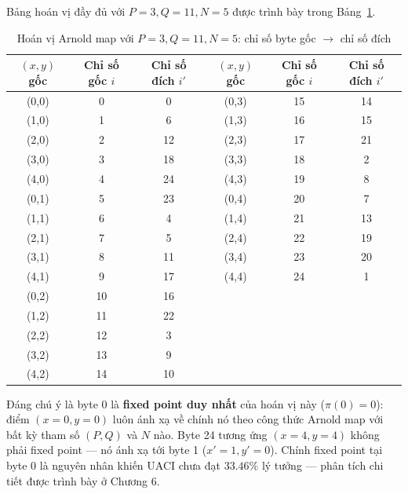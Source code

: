 Bảng hoán vị đầy đủ với $P=3, Q=11, N=5$ được trình bày trong Bảng~\ref{tab:arnold_perm}.

\begin{table}[ht]
\centering
\caption{Hoán vị Arnold map với $P=3, Q=11, N=5$: chỉ số byte gốc $\to$ chỉ số đích}
\label{tab:arnold_perm}
\begin{tabular}{|c|c|c||c|c|c|}
\hline
$(x,y)$ gốc & Chỉ số gốc $i$ & Chỉ số đích $i'$ &
$(x,y)$ gốc & Chỉ số gốc $i$ & Chỉ số đích $i'$ \\
\hline
(0,0) & 0  & 0  & (0,3) & 15 & 14 \\
\hline
(1,0) & 1  & 6  & (1,3) & 16 & 15 \\
\hline
(2,0) & 2  & 12 & (2,3) & 17 & 21 \\
\hline
(3,0) & 3  & 18 & (3,3) & 18 & 2  \\
\hline
(4,0) & 4  & 24 & (4,3) & 19 & 8  \\
\hline
(0,1) & 5  & 23 & (0,4) & 20 & 7  \\
\hline
(1,1) & 6  & 4  & (1,4) & 21 & 13 \\
\hline
(2,1) & 7  & 5  & (2,4) & 22 & 19 \\
\hline
(3,1) & 8  & 11 & (3,4) & 23 & 20 \\
\hline
(4,1) & 9  & 17 & (4,4) & 24 & 1  \\
\hline
(0,2) & 10 & 16 & & & \\
\hline
(1,2) & 11 & 22 & & & \\
\hline
(2,2) & 12 & 3  & & & \\
\hline
(3,2) & 13 & 9  & & & \\
\hline
(4,2) & 14 & 10 & & & \\
\hline
\end{tabular}
\end{table}

Đáng chú ý là byte 0 là \textbf{fixed point duy nhất} của hoán vị này ($\pi(0) = 0$): điểm $(x{=}0, y{=}0)$ luôn ánh xạ về chính nó theo công thức Arnold map với bất kỳ tham số $(P, Q)$ và $N$ nào. Byte 24 tương ứng $(x{=}4, y{=}4)$ không phải fixed point --- nó ánh xạ tới byte 1 ($x'{=}1, y'{=}0$). Chính fixed point tại byte 0 là nguyên nhân khiến UACI chưa đạt $33.46\%$ lý tưởng --- phân tích chi tiết được trình bày ở Chương 6.

